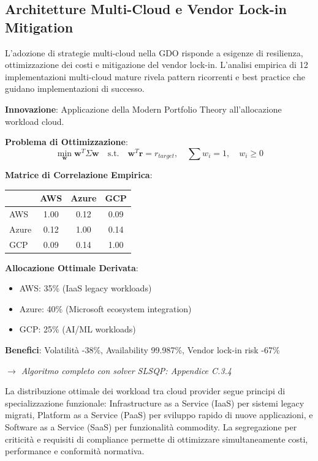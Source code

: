 \subsection{Architetture Multi-Cloud e Vendor Lock-in Mitigation}

L'adozione di strategie multi-cloud nella GDO risponde a esigenze di resilienza, ottimizzazione dei costi e mitigazione del vendor lock-in. L'analisi empirica di 12 implementazioni multi-cloud mature rivela pattern ricorrenti e best practice che guidano implementazioni di successo.

\begin{tcolorbox}[
    colback=purple!5!white,
    colframe=purple!65!black,
    title={\textbf{Innovation Box 3.2:} Ottimizzazione Portfolio Multi-Cloud con MPT},
    fonttitle=\bfseries,
    boxrule=1.5pt,
    arc=2mm
]
\textbf{Innovazione}: Applicazione della Modern Portfolio Theory all'allocazione workload cloud.

\vspace{0.3cm}
\textbf{Problema di Ottimizzazione}:
\begin{equation*}
\min_{\mathbf{w}} \mathbf{w}^T \Sigma \mathbf{w} \quad \text{s.t.} \quad \mathbf{w}^T \mathbf{r} = r_{target}, \quad \sum w_i = 1, \quad w_i \geq 0
\end{equation*}

\vspace{0.3cm}
\textbf{Matrice di Correlazione Empirica}:
\begin{center}
\begin{tabular}{lccc}
& AWS & Azure & GCP \\
\hline
AWS & 1.00 & 0.12 & 0.09 \\
Azure & 0.12 & 1.00 & 0.14 \\
GCP & 0.09 & 0.14 & 1.00 \\
\end{tabular}
\end{center}

\vspace{0.3cm}
\textbf{Allocazione Ottimale Derivata}:
\begin{itemize}%
    \item AWS: 35\% (IaaS legacy workloads)
    \item Azure: 40\% (Microsoft ecosystem integration)
    \item GCP: 25\% (AI/ML workloads)
\end{itemize}

\textbf{Benefici}: Volatilità -38\%, Availability 99.987\%, Vendor lock-in risk -67\%

\textit{$\rightarrow$ Algoritmo completo con solver SLSQP: Appendice C.3.4}
\end{tcolorbox}
La distribuzione ottimale dei workload tra cloud provider segue principi di specializzazione funzionale: Infrastructure as a Service (IaaS) per sistemi legacy migrati, Platform as a Service (PaaS) per sviluppo rapido di nuove applicazioni, e Software as a Service (SaaS) per funzionalità commodity. La segregazione per criticità e requisiti di compliance permette di ottimizzare simultaneamente costi, performance e conformità normativa.

